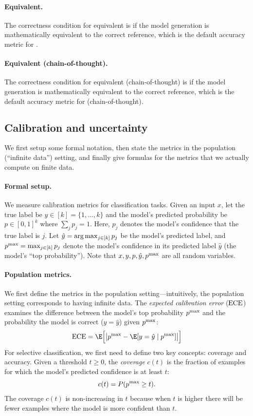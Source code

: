 \paragraph{Equivalent.} 
The correctness condition for equivalent is if the model generation is mathematically equivalent to the correct reference, which is the default accuracy metric for \MATH. 

\paragraph{Equivalent (chain-of-thought).} 
The correctness condition for equivalent (chain-of-thought) is if the model generation is mathematically equivalent to the correct reference, which is the default accuracy metric for \MATH (chain-of-thought). 

\subsection{Calibration and uncertainty}
\label{app:metrics-calibration}

We first setup some formal notation, then state the metrics in the population (``infinite data'') setting, and finally give formulas for the metrics that we actually compute on finite data.

\paragraph{Formal setup.}
We measure calibration metrics for classification tasks.
Given an input $x$, let the true label be $y \in [k] = \{1, \ldots, k\}$ and the model's predicted probability be $p \in [0, 1]^k$ where $\sum_j p_j = 1$. Here, $p_j$ denotes the model's confidence that the true label is $j$.
Let $\hat{y} = \arg \max_{j \in [k]} p_j$ be the model's predicted label, and $p^{\sf{\max}} = \max_{j \in [k]} p_j$ denote the model's confidence in its predicted label $\hat{y}$ (the model's ``top probability''). Note that $x, y, p, \hat{y}, p^{\sf{\max}}$ are all random variables.

\paragraph{Population metrics.} 
We first define the metrics in the population setting---intuitively, the population setting corresponds to having infinite data.
The \emph{expected calibration error} ($\mbox{ECE}$) examines the difference between the model’s top probability $p^{\sf{\max}}$ and the probability the model is correct ($y = \hat{y}$) given $p^{\sf{\max}}$:
\begin{equation}
\ece = \E\Big[ \big\lvert \pmax - \E[y = \hat{y} \mid \pmax] \big\rvert \Big]
\end{equation}For selective classification, we first need to define two key concepts: coverage and accuracy. Given a threshold $t \geq 0$, the \emph{coverage} $c(t)$ is the fraction of examples for which the model's predicted confidence is at least $t$:
\begin{equation}
c(t) = P(p^{\sf{\max}} \geq t).
\end{equation}
The coverage $c(t)$ is non-increasing in $t$ because when $t$ is higher there will be fewer examples where the model is more confident than $t$.

